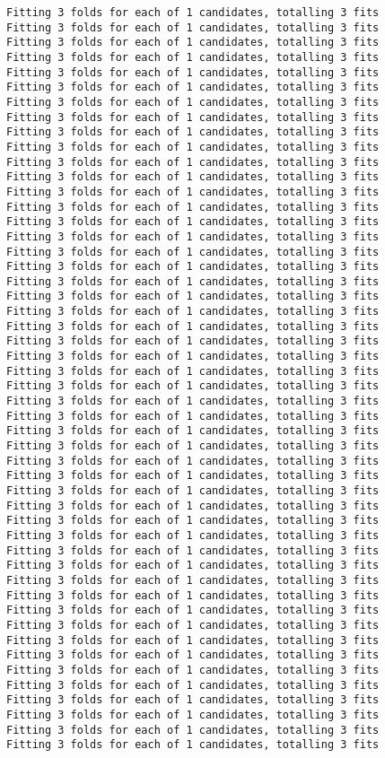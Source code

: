 \documentclass[
  letterpaper,
  DIV=11,
  numbers=noendperiod]{scrreprt}
\begin{document}
\begin{verbatim}
Fitting 3 folds for each of 1 candidates, totalling 3 fits
Fitting 3 folds for each of 1 candidates, totalling 3 fits
Fitting 3 folds for each of 1 candidates, totalling 3 fits
Fitting 3 folds for each of 1 candidates, totalling 3 fits
Fitting 3 folds for each of 1 candidates, totalling 3 fits
Fitting 3 folds for each of 1 candidates, totalling 3 fits
Fitting 3 folds for each of 1 candidates, totalling 3 fits
Fitting 3 folds for each of 1 candidates, totalling 3 fits
Fitting 3 folds for each of 1 candidates, totalling 3 fits
Fitting 3 folds for each of 1 candidates, totalling 3 fits
Fitting 3 folds for each of 1 candidates, totalling 3 fits
Fitting 3 folds for each of 1 candidates, totalling 3 fits
Fitting 3 folds for each of 1 candidates, totalling 3 fits
Fitting 3 folds for each of 1 candidates, totalling 3 fits
Fitting 3 folds for each of 1 candidates, totalling 3 fits
Fitting 3 folds for each of 1 candidates, totalling 3 fits
Fitting 3 folds for each of 1 candidates, totalling 3 fits
Fitting 3 folds for each of 1 candidates, totalling 3 fits
Fitting 3 folds for each of 1 candidates, totalling 3 fits
Fitting 3 folds for each of 1 candidates, totalling 3 fits
Fitting 3 folds for each of 1 candidates, totalling 3 fits
Fitting 3 folds for each of 1 candidates, totalling 3 fits
Fitting 3 folds for each of 1 candidates, totalling 3 fits
Fitting 3 folds for each of 1 candidates, totalling 3 fits
Fitting 3 folds for each of 1 candidates, totalling 3 fits
Fitting 3 folds for each of 1 candidates, totalling 3 fits
Fitting 3 folds for each of 1 candidates, totalling 3 fits
Fitting 3 folds for each of 1 candidates, totalling 3 fits
Fitting 3 folds for each of 1 candidates, totalling 3 fits
Fitting 3 folds for each of 1 candidates, totalling 3 fits
Fitting 3 folds for each of 1 candidates, totalling 3 fits
Fitting 3 folds for each of 1 candidates, totalling 3 fits
Fitting 3 folds for each of 1 candidates, totalling 3 fits
Fitting 3 folds for each of 1 candidates, totalling 3 fits
Fitting 3 folds for each of 1 candidates, totalling 3 fits
Fitting 3 folds for each of 1 candidates, totalling 3 fits
Fitting 3 folds for each of 1 candidates, totalling 3 fits
Fitting 3 folds for each of 1 candidates, totalling 3 fits
Fitting 3 folds for each of 1 candidates, totalling 3 fits
Fitting 3 folds for each of 1 candidates, totalling 3 fits
Fitting 3 folds for each of 1 candidates, totalling 3 fits
Fitting 3 folds for each of 1 candidates, totalling 3 fits
Fitting 3 folds for each of 1 candidates, totalling 3 fits
Fitting 3 folds for each of 1 candidates, totalling 3 fits
Fitting 3 folds for each of 1 candidates, totalling 3 fits
Fitting 3 folds for each of 1 candidates, totalling 3 fits
Fitting 3 folds for each of 1 candidates, totalling 3 fits
Fitting 3 folds for each of 1 candidates, totalling 3 fits
Fitting 3 folds for each of 1 candidates, totalling 3 fits
Fitting 3 folds for each of 1 candidates, totalling 3 fits


\end{verbatim}
\end{document}
